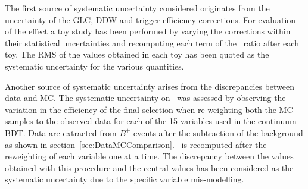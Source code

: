 
The first source of systematic uncertainty considered originates
from the uncertainty of the GLC, DDW and trigger efficiency corrections.
For evaluation of the effect a toy study has been performed by varying
the corrections within their statistical uncertainties and recomputing
each term of the \theRho\ ratio after each toy. The RMS of the values
obtained in each toy has been quoted as the systematic uncertainty for
the various quantities. %

Another source of systematic uncertainty arises from the discrepancies
between data and MC. The systematic uncertainty on \theRho\ was assessed
by observing the variation in the efficiency of the final selection when
re-weighting both the MC samples to the observed data for each of the 15
variables used in the continuum BDT.
Data are extracted from $B^{+}$ events after the subtraction of the
background as shown in section~\ref{sec:DataMCComparison}.  \theRho\ is recomputed after the reweighting of each variable
one at a time. The discrepancy between the values obtained with this
procedure and the central values has been considered as the systematic
uncertainty due to the specific variable mis-modelling.\\


